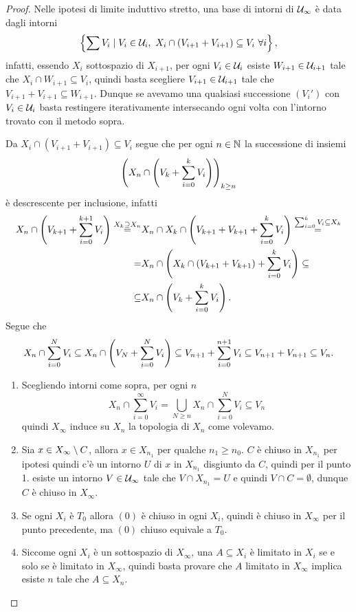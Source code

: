 \begin{proof}
Nelle ipotesi di limite induttivo stretto, una base di intorni di $\mathcal{U}_\infty$ \`e data dagli intorni 
\[\cpa{\sum V_i \mid V_i\in \Uc_i,\ X_i\cap (V_{i+1}+V_{i+1})\subseteq V_i\ \forall i},\] 
infatti, essendo $X_i$ sottospazio di $X_{i+1}$, per ogni $V_i\in\mathcal{U}_i$ esiste $W_{i+1}\in \mathcal{U}_{i+1}$ tale che $X_i\cap W_{i+1}\subseteq V_i$, quindi basta scegliere $V_{i+1}\in \mathcal{U}_{i+1}$ tale che $V_{i+1}+V_{i+1}\subseteq W_{i+1}$. Dunque se avevamo una qualsiasi successione $(V_i')$ con $V_i\in\mathcal{U}_i$ basta restingere iterativamente intersecando ogni volta con l'intorno trovato con il metodo sopra.
\medskip

Da $X_i\cap(V_{i+1}+V_{i+1})\subseteq V_i$ segue che per ogni $n\in\mathbb{N}$ la successione di insiemi
\[\left({X_n\cap \left({V_k+\sum_{i=0}^k V_i}\right)}\right)_{k\geq n}\]
\`e descrescente per inclusione, infatti 
\begin{align*}
    X_n\cap\left({V_{k+1}+\sum_{i=0}^{k+1}V_i}\right)\overset{X_k\supseteq X_n}=&X_n\cap X_{k}\cap \left({V_{k+1}+V_{k+1}+\sum_{i=0}^{k}V_i}\right)\overset{\sum_{i=0}^k V_i\subseteq X_k}=\\
    =&X_n\cap\left({X_k\cap\left({V_{k+1}+V_{k+1}}\right) + \sum_{i=0}^k V_i}\right)\subseteq\\
    \subseteq&X_n\cap\left({V_k+ \sum_{i=0}^k V_i}\right).
\end{align*}
Segue che 
\[X_n\cap\sum_{i=0}^N V_i\subseteq X_n\cap \left({V_N+\sum_{i=0}^N V_i}\right)\subseteq V_{n+1}+\sum_{i=0}^{n+1} V_i\subseteq V_{n+1}+V_{n+1}\subseteq V_n.\]
\setlength{\leftmargini}{0cm}
\begin{enumerate}
\item Scegliendo intorni come sopra, per ogni $n$
\[X_n\cap\sum_{i=0}^\infty V_i=\bigcup_{N\geq n}X_n\cap\sum_{i=0}^N V_i\subseteq V_n\]
quindi $X_\infty$ induce su $X_n$ la topologia di $X_n$ come volevamo.
\item Sia $x\in X_\infty\setminus C$, allora $x\in X_{n_1}$ per qualche $n_1\geq n_0$. $C$ \`e chiuso in $X_{n_1}$ per ipotesi quindi c'\`e un intorno $U$ di $x$ in $X_{n_1}$ disgiunto da $C$, quindi per il punto 1. esiste un intorno $V\in \mathcal{U}_\infty$ tale che $V\cap X_{n_1}=U$ e quindi $V\cap C=\emptyset$, dunque $C$ \`e chiuso in $X_\infty$.
\item Se ogni $X_i$ \`e $T_0$ allora $(0)$ \`e chiuso in ogni $X_i$, quindi \`e chiuso in $X_\infty$ per il punto precedente, ma $(0)$ chiuso equivale a $T_0$.
\item Siccome ogni $X_i$ \`e un sottospazio di $X_\infty$, una $A\subseteq X_i$ \`e limitato in $X_i$ se e solo se \`e limitato in $X_\infty$, quindi basta provare che $A$ limitato in $X_\infty$ implica esiste $n$ tale che $A\subseteq X_n$.


\end{enumerate}
\end{proof}
